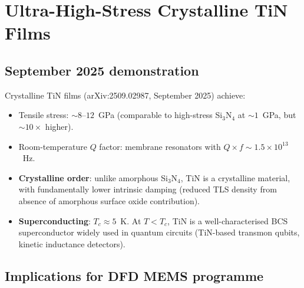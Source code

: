 \documentclass[11pt]{article}
\newcommand{\ee}[1]{\times 10^{#1}}
\theoremstyle{definition}
\theoremstyle{remark}
\begin{document}
\section{Ultra-High-Stress Crystalline TiN Films}
\label{sec:TiN}

\subsection{September 2025 demonstration}

Crystalline TiN films (arXiv:2509.02987, September 2025) achieve:
\begin{itemize}[nosep]
\item Tensile stress: $\sim 8$--$12$~GPa (comparable to high-stress
  Si$_3$N$_4$ at $\sim 1$~GPa, but $\sim 10\times$ higher).
\item Room-temperature $Q$ factor: membrane resonators with
  $Q\times f \sim 1.5\ee{13}$~Hz.
\item \textbf{Crystalline order}: unlike amorphous Si$_3$N$_4$,
  TiN is a crystalline material, with fundamentally lower intrinsic
  damping (reduced TLS density from absence of amorphous surface
  oxide contribution).
\item \textbf{Superconducting}: $T_c \approx 5$~K. At $T < T_c$,
  TiN is a well-characterised BCS superconductor widely used in
  quantum circuits (TiN-based transmon qubits, kinetic inductance
  detectors).
\end{itemize}

\subsection{Implications for DFD MEMS programme}
\end{document}
